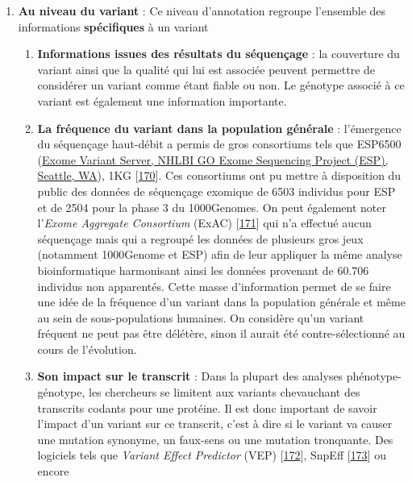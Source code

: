 \documentclass[12pt,a4paper,twoside]{ugathesis}
\providecommand{\tightlist}{%
  \setlength{\itemsep}{0pt}\setlength{\parskip}{0pt}}
\theoremstyle{definition}
\theoremstyle{definition}
\theoremstyle{definition}
\theoremstyle{remark}
\begin{document}
\begin{enumerate}
\def\labelenumi{\arabic{enumi}.}
\tightlist
\item
  \textbf{Au niveau du variant} : Ce niveau d'annotation regroupe
  l'ensemble des informations \textbf{spécifiques} à un variant

  \begin{enumerate}
  \def\labelenumii{\alph{enumii}.}
  \item
    \textbf{Informations issues des résultats du séquençage} : la
    couverture du variant ainsi que la qualité qui lui est associée
    peuvent permettre de considérer un variant comme étant fiable ou
    non. Le génotype associé à ce variant est également une information
    importante.
  \item
    \textbf{La fréquence du variant dans la population générale} :
    l'émergence du séquençage haut-débit a permis de gros consortiums
    tels que ESP6500 (\href{http://evs.gs.washington.edu/EVS/}{Exome
    Variant Server, NHLBI GO Exome Sequencing Project (ESP), Seattle,
    WA}), 1KG
    {[}\protect\hyperlink{ref-1000GenomesProjectConsortium2015}{170}{]}.
    Ces consortiums ont pu mettre à disposition du public des données de
    séquençage exomique de 6503 individus pour ESP et de 2504 pour la
    phase 3 du 1000Genomes. On peut également noter l'\emph{Exome
    Aggregate Consortium} (ExAC)
    {[}\protect\hyperlink{ref-Lek2016}{171}{]} qui n'a effectué aucun
    séquençage mais qui a regroupé les données de plusieurs gros jeux
    (notamment 1000Genome et ESP) afin de leur appliquer la même analyse
    bioinformatique harmonisant ainsi les données provenant de 60.706
    individus non apparentés. Cette masse d'information permet de se
    faire une idée de la fréquence d'un variant dans la population
    générale et même au sein de sous-populations humaines. On considère
    qu'un variant fréquent ne peut pas être délétère, sinon il aurait
    été contre-sélectionné au cours de l'évolution.
  \item
    \textbf{Son impact sur le transcrit} : Dans la plupart des analyses
    phénotype-génotype, les chercheurs se limitent aux variants
    chevauchant des transcrits codants pour une protéine. Il est donc
    important de savoir l'impact d'un variant sur ce transcrit, c'est à
    dire si le variant va causer une mutation synonyme, un faux-sens ou
    une mutation tronquante. Des logiciels tels que \emph{Variant Effect
    Predictor} (VEP) {[}\protect\hyperlink{ref-McLaren2016}{172}{]},
    SnpEff {[}\protect\hyperlink{ref-Cingolani2012}{173}{]} ou encore

\end{enumerate}
\end{enumerate}
\end{document}
